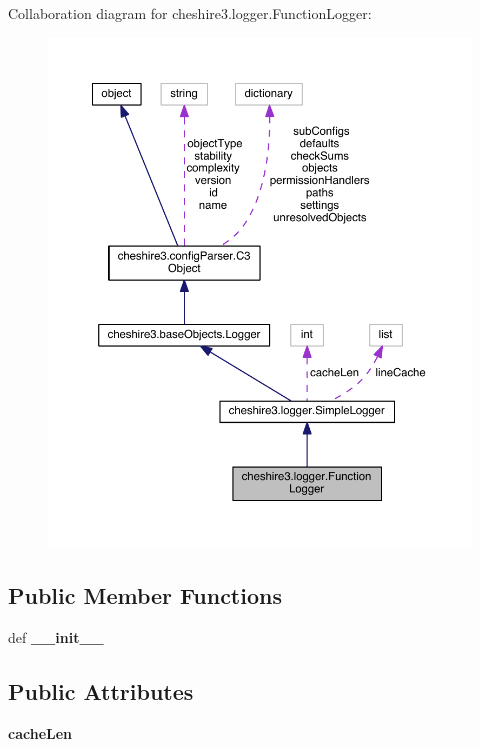 Collaboration diagram for cheshire3.\-logger.\-Function\-Logger\-:
\nopagebreak
\begin{figure}[H]
\begin{center}
\leavevmode
\includegraphics[width=350pt]{classcheshire3_1_1logger_1_1_function_logger__coll__graph}
\end{center}
\end{figure}
\subsection*{Public Member Functions}
\begin{DoxyCompactItemize}
\item 
\hypertarget{classcheshire3_1_1logger_1_1_function_logger_a9473a3cef90ebda08fe9951fa15aa30f}{def {\bfseries \-\_\-\-\_\-init\-\_\-\-\_\-}}\label{classcheshire3_1_1logger_1_1_function_logger_a9473a3cef90ebda08fe9951fa15aa30f}

\end{DoxyCompactItemize}
\subsection*{Public Attributes}
\begin{DoxyCompactItemize}
\item 
\hypertarget{classcheshire3_1_1logger_1_1_function_logger_a66c9e4d28f1a1a5f2e9018803df2fcea}{{\bfseries cache\-Len}}\label{classcheshire3_1_1logger_1_1_function_logger_a66c9e4d28f1a1a5f2e9018803df2fcea}

\end{DoxyCompactItemize}
